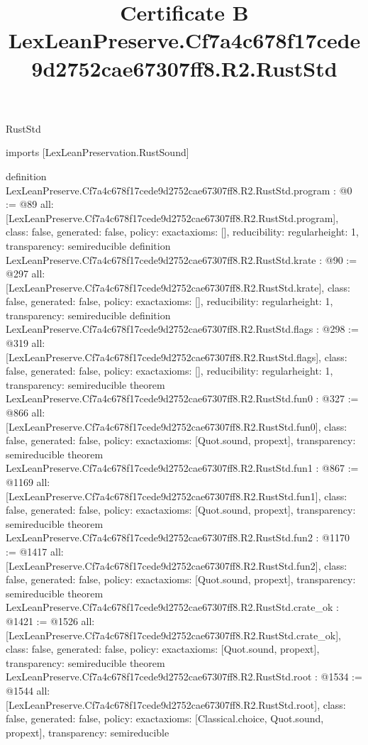 \begin{lexlean}{RustStd}
\title{Certificate B LexLeanPreserve.Cf7a4c678f17cede9d2752cae67307ff8.R2.RustStd}
\begin{coremodule}
imports [LexLeanPreservation.RustSound]

definition LexLeanPreserve.Cf7a4c678f17cede9d2752cae67307ff8.R2.RustStd.program : @0 := @89 {
  all: [LexLeanPreserve.Cf7a4c678f17cede9d2752cae67307ff8.R2.RustStd.program],
  class: false,
  generated: false,
  policy: exact{axioms: []},
  reducibility: regular{height: 1},
  transparency: semireducible
}
definition LexLeanPreserve.Cf7a4c678f17cede9d2752cae67307ff8.R2.RustStd.krate : @90 := @297 {
  all: [LexLeanPreserve.Cf7a4c678f17cede9d2752cae67307ff8.R2.RustStd.krate],
  class: false,
  generated: false,
  policy: exact{axioms: []},
  reducibility: regular{height: 1},
  transparency: semireducible
}
definition LexLeanPreserve.Cf7a4c678f17cede9d2752cae67307ff8.R2.RustStd.flags : @298 := @319 {
  all: [LexLeanPreserve.Cf7a4c678f17cede9d2752cae67307ff8.R2.RustStd.flags],
  class: false,
  generated: false,
  policy: exact{axioms: []},
  reducibility: regular{height: 1},
  transparency: semireducible
}
theorem LexLeanPreserve.Cf7a4c678f17cede9d2752cae67307ff8.R2.RustStd.fun0 : @327 := @866 {
  all: [LexLeanPreserve.Cf7a4c678f17cede9d2752cae67307ff8.R2.RustStd.fun0],
  class: false,
  generated: false,
  policy: exact{axioms: [Quot.sound, propext]},
  transparency: semireducible
}
theorem LexLeanPreserve.Cf7a4c678f17cede9d2752cae67307ff8.R2.RustStd.fun1 : @867 := @1169 {
  all: [LexLeanPreserve.Cf7a4c678f17cede9d2752cae67307ff8.R2.RustStd.fun1],
  class: false,
  generated: false,
  policy: exact{axioms: [Quot.sound, propext]},
  transparency: semireducible
}
theorem LexLeanPreserve.Cf7a4c678f17cede9d2752cae67307ff8.R2.RustStd.fun2 : @1170 := @1417 {
  all: [LexLeanPreserve.Cf7a4c678f17cede9d2752cae67307ff8.R2.RustStd.fun2],
  class: false,
  generated: false,
  policy: exact{axioms: [Quot.sound, propext]},
  transparency: semireducible
}
theorem LexLeanPreserve.Cf7a4c678f17cede9d2752cae67307ff8.R2.RustStd.crate_ok : @1421 := @1526 {
  all: [LexLeanPreserve.Cf7a4c678f17cede9d2752cae67307ff8.R2.RustStd.crate_ok],
  class: false,
  generated: false,
  policy: exact{axioms: [Quot.sound, propext]},
  transparency: semireducible
}
theorem LexLeanPreserve.Cf7a4c678f17cede9d2752cae67307ff8.R2.RustStd.root : @1534 := @1544 {
  all: [LexLeanPreserve.Cf7a4c678f17cede9d2752cae67307ff8.R2.RustStd.root],
  class: false,
  generated: false,
  policy: exact{axioms: [Classical.choice, Quot.sound, propext]},
  transparency: semireducible
}


\end{coremodule}
\end{lexlean}
